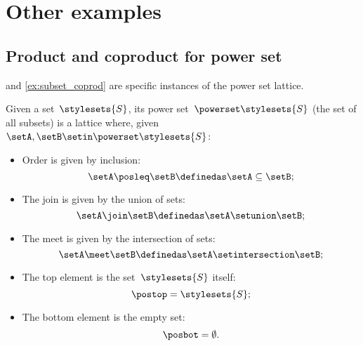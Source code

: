 
\section{Other examples}

\subsection{Product and coproduct for power set}
 and \cref{ex:subset_coprod} are specific instances of the power set lattice.

\begin{ctdefinition}
    \label{def:power-set-as-lattice}
    Given a set~$\stylesets{S}$, its power set~$\powerset \stylesets{S}$ (the set of all subsets) is a lattice where, given~$\setA,\setB\setin \powerset \stylesets{S}$:
    \begin{itemize}
        \item Order is given by inclusion:
              \begin{equation*}
                  \setA\posleq \setB \definedas \setA\subseteq \setB;
              \end{equation*}
        \item The join is given by the union of sets:
              \begin{equation*}
                  \setA\join \setB \definedas \setA\setunion \setB;
              \end{equation*}
        \item The meet is given by the intersection of sets:
              \begin{equation*}
                  \setA\meet \setB \definedas \setA\setintersection \setB;
              \end{equation*}
        \item The top element is the set~$\stylesets{S}$ itself:
              \begin{equation*}
                  \postop = \stylesets{S};
              \end{equation*}
        \item The bottom element is the empty set:
              \begin{equation*}
                  \posbot = \emptyset.
              \end{equation*}
    \end{itemize}
\end{ctdefinition}

